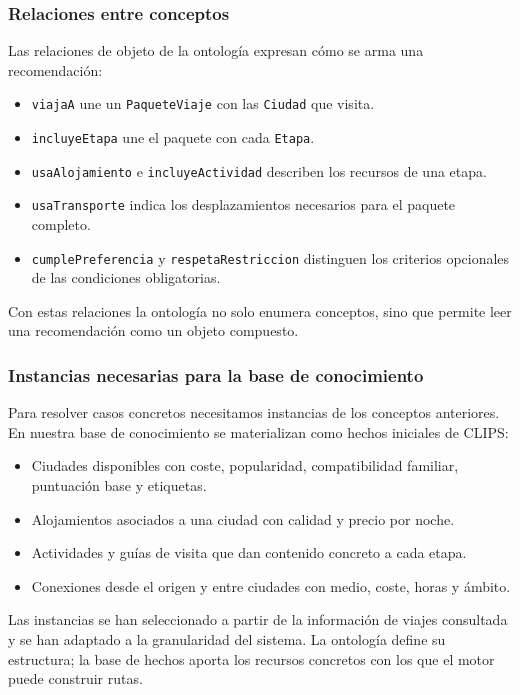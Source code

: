 \documentclass[11pt,a4paper]{article}
\begin{document}
\subsubsection{Relaciones entre conceptos}
Las relaciones de objeto de la ontolog\'ia expresan c\'omo se arma una
recomendaci\'on:
\begin{itemize}
    \item \texttt{viajaA} une un \texttt{PaqueteViaje} con las
    \texttt{Ciudad} que visita.
    \item \texttt{incluyeEtapa} une el paquete con cada \texttt{Etapa}.
    \item \texttt{usaAlojamiento} e \texttt{incluyeActividad} describen los
    recursos de una etapa.
    \item \texttt{usaTransporte} indica los desplazamientos necesarios para el
    paquete completo.
    \item \texttt{cumplePreferencia} y \texttt{respetaRestriccion} distinguen
    los criterios opcionales de las condiciones obligatorias.
\end{itemize}

Con estas relaciones la ontolog\'ia no solo enumera conceptos, sino que permite
leer una recomendaci\'on como un objeto compuesto.

\subsubsection{Instancias necesarias para la base de conocimiento}
Para resolver casos concretos necesitamos instancias de los conceptos
anteriores. En nuestra base de conocimiento se materializan como hechos
iniciales de CLIPS:
\begin{itemize}
    \item Ciudades disponibles con coste, popularidad, compatibilidad familiar,
    puntuaci\'on base y etiquetas.
    \item Alojamientos asociados a una ciudad con calidad y precio por noche.
    \item Actividades y gu\'ias de visita que dan contenido concreto a cada
    etapa.
    \item Conexiones desde el origen y entre ciudades con medio, coste, horas y
    \'ambito.
\end{itemize}

Las instancias se han seleccionado a partir de la informaci\'on de viajes
consultada y se han adaptado a la granularidad del sistema. La ontolog\'ia
define su estructura; la base de hechos aporta los recursos concretos con los
que el motor puede construir rutas.
\end{document}
